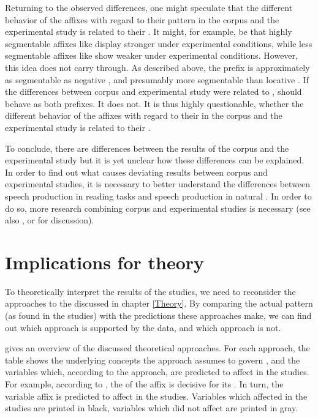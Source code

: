 Returning to the observed differences, one might speculate that the different behavior of the affixes with regard to their  pattern in the corpus and the experimental study is related to their . It might, for example, be that highly segmentable affixes like  display stronger  under experimental conditions, while less segmentable affixes like  show weaker  under experimental conditions. However, this idea does not carry through. As described above, the prefix  is approximately as segmentable as negative , and presumably more segmentable than locative . If the differences between corpus and experimental study were related to ,  should behave as both prefixes. It does not. %
It is thus highly questionable, whether the different behavior of the affixes with regard to their  in the corpus and the experimental study is related to their .

To conclude, there are differences between the results of the corpus and the experimental study but it is yet unclear how these differences can be explained. In order to find out what causes deviating results between corpus and experimental studies, it is necessary to better understand the differences between speech production in reading tasks and speech production in natural . In order to do so, more research combining corpus and experimental studies is necessary (see also , or \cite{Arppe.2007} for discussion). 





\section{Implications for theory}


To theoretically interpret the results of the studies, we need to reconsider the approaches to the  discussed in chapter \ref{Theory}.   By comparing the actual  pattern (as found in the studies) with the predictions these approaches make, we can find out which approach is supported by the data, and which approach is not.



 gives an overview of the discussed theoretical approaches. For each approach, the table shows the underlying concepts the approach assumes to govern , and the variables which, according to the approach, are predicted to affect  in the studies. For example, according to , the  of the affix is decisive for its . In turn, the variable affix is predicted to affect  in the studies. 
Variables which affected  in the studies are printed in black, variables which did not affect  are printed in gray.






